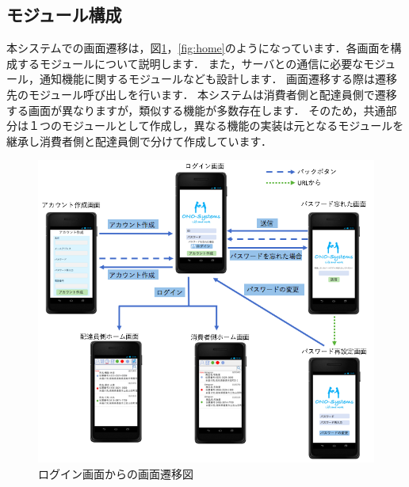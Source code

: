 \documentclass[a4j,titlepage]{jarticle}
\begin{document}
\subsection{モジュール構成}
本システムでの画面遷移は，図\ref{fig:login}，\ref{fig:home}のようになっています．各画面を構成するモジュールについて説明します．
また，サーバとの通信に必要なモジュール，通知機能に関するモジュールなども設計します．
画面遷移する際は遷移先のモジュール呼び出しを行います．
本システムは消費者側と配達員側で遷移する画面が異なりますが，類似する機能が多数存在します．
そのため，共通部分は１つのモジュールとして作成し，異なる機能の実装は元となるモジュールを継承し消費者側と配達員側で分けて作成しています．
\begin{figure}[H]
 \begin{center}
  \includegraphics[width=150mm]{screen_transition_login.png}
  \caption{ログイン画面からの画面遷移図}
  \label{fig:login}
 \end{center}
\end{figure}
\end{document}
